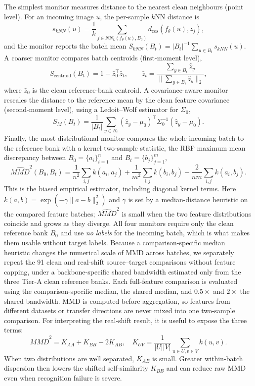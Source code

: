 \documentclass[a4paper,fleqn]{els-cas-templates/cas-sc}
\begin{document}
The simplest monitor measures distance to the nearest clean neighbours
(point level). For an incoming image $u$, the per-sample $k$NN distance is
\begin{equation}
  s_{kNN}(u)=
  \frac{1}{k}\sum_{j\in NN_k(f_\theta(u),B_0)}
  d_{\cos}(f_\theta(u),z_j),
\end{equation}
and the monitor reports the batch mean
$S_{kNN}(B_t)=|B_t|^{-1}\sum_{u\in B_t}s_{kNN}(u)$. A coarser monitor compares
batch centroids (first-moment level),
\begin{equation}
  S_{\mathrm{centroid}}(B_t)=1-\bar{z}_0^{\top}\bar{z}_t,
  \qquad
  \bar{z}_t=\frac{\sum_{y\in B_t}\hat{z}_y}{\|\sum_{y\in B_t}\hat{z}_y\|_2},
\end{equation}
where $\bar z_0$ is the clean reference-bank centroid. A covariance-aware monitor
rescales the distance to the reference mean by the clean feature covariance
(second-moment level), using a Ledoit--Wolf estimator \citep{ledoit2004well} for
$\Sigma_0$,
\begin{equation}
  S_M(B_t)=\frac{1}{|B_t|}\sum_{y\in B_t}
  (\hat{z}_y-\mu_0)^{\top}\Sigma_0^{-1}(\hat{z}_y-\mu_0).
\end{equation}
Finally, the most distributional monitor compares the whole incoming batch to the
reference bank with a kernel two-sample statistic, the RBF maximum mean
discrepancy between $B_0=\{a_i\}_{i=1}^{n}$ and $B_t=\{b_j\}_{j=1}^{m}$,
\begin{equation}
  \widehat{MMD}^2(B_0,B_t)=
  \frac{1}{n^2}\sum_{i,j} k(a_i,a_j)
  +\frac{1}{m^2}\sum_{i,j} k(b_i,b_j)
  -\frac{2}{nm}\sum_{i,j} k(a_i,b_j).
\end{equation}
This is the biased empirical estimator, including diagonal kernel terms.
Here $k(a,b)=\exp(-\gamma\|a-b\|_2^2)$ and $\gamma$ is set by a median-distance
heuristic on the compared feature batches; $\widehat{MMD}^2$ is small when the two
feature distributions coincide and grows as they diverge. All four monitors
require only the clean reference bank $B_0$ and use \emph{no labels} for the
incoming batch, which is what makes them usable without target labels.
Because a comparison-specific median heuristic changes the numerical scale of
MMD across batches, we separately repeat the 91 clean and real-shift
source--target comparisons without feature capping, under a backbone-specific
shared bandwidth estimated only from the three Tier-A clean reference banks.
Each full-feature comparison is evaluated using the comparison-specific median,
the shared median, and $0.5\times$ and $2\times$ the shared bandwidth.
MMD is computed before aggregation, so features from different datasets or
transfer directions are never mixed into one two-sample comparison.
For interpreting the real-shift result, it is useful to expose the three terms:
\begin{equation}
  \widehat{MMD}^2=K_{AA}+K_{BB}-2K_{AB},
  \quad
  K_{UV}=\frac{1}{|U||V|}\sum_{u\in U,v\in V}k(u,v).
  \label{eq:mmd_terms}
\end{equation}
When two distributions are well separated, $K_{AB}$ is small. Greater
within-batch dispersion then lowers the shifted self-similarity $K_{BB}$ and can
reduce raw MMD even when recognition failure is severe.
\end{document}
